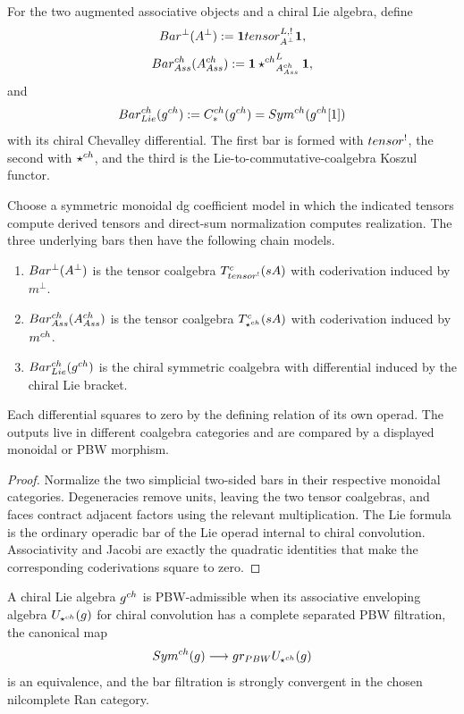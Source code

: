 \begin{definition}
For the two augmented associative objects and a chiral Lie algebra, define
\[
 Bar^{\perp}(A^\perp)
   :=\mathbf{1}tensor_{A^\perp}^{L,!}\mathbf{1},
\]
\[
 Bar^{ch}_{Ass}(A^{ch}_{Ass})
   :=\mathbf{1}\mathbin{\star^{ch}}_{A^{ch}_{Ass}}^{L}\mathbf{1},
\]
and
\[
 Bar^{ch}_{Lie}(g^{ch})
   :=C_*^{ch}(g^{ch})
   =Sym^{ch}(g^{ch}[1])
\]
with its chiral Chevalley differential.  The first bar is formed with $tensor^!$, the second with $\mathbin{\star^{ch}}$, and the third is the Lie-to-commutative-coalgebra Koszul functor.
\end{definition}

\begin{theorem}
Choose a symmetric monoidal dg coefficient model in which the indicated tensors compute derived tensors and direct-sum normalization computes realization. The three underlying bars then have the following chain models.
\begin{enumerate}
\item $Bar^{\perp}(A^\perp)$ is the tensor coalgebra $T^c_{tensor^!}(sA)$ with coderivation induced by $m^\perp$.
\item $Bar^{ch}_{Ass}(A^{ch}_{Ass})$ is the tensor coalgebra $T^c_{\mathbin{\star^{ch}}}(sA)$ with coderivation induced by $m^{ch}$.
\item $Bar^{ch}_{Lie}(g^{ch})$ is the chiral symmetric coalgebra with differential induced by the chiral Lie bracket.
\end{enumerate}
Each differential squares to zero by the defining relation of its own operad.  The outputs live in different coalgebra categories and are compared by a displayed monoidal or PBW morphism.
\end{theorem}
\begin{proof}
Normalize the two simplicial two-sided bars in their respective monoidal categories.  Degeneracies remove units, leaving the two tensor coalgebras, and faces contract adjacent factors using the relevant multiplication.  The Lie formula is the ordinary operadic bar of the Lie operad internal to chiral convolution.  Associativity and Jacobi are exactly the quadratic identities that make the corresponding coderivations square to zero.
\end{proof}

\begin{definition}
A chiral Lie algebra $g^{ch}$ is PBW-admissible when its associative enveloping algebra $U_{\mathbin{\star^{ch}}}(g)$ for chiral convolution has a complete separated PBW filtration, the canonical map
\[
 Sym^{ch}(g)\longrightarrow gr_{PBW}U_{\mathbin{\star^{ch}}}(g)
\]
is an equivalence, and the bar filtration is strongly convergent in the chosen nilcomplete Ran category.
\end{definition}

